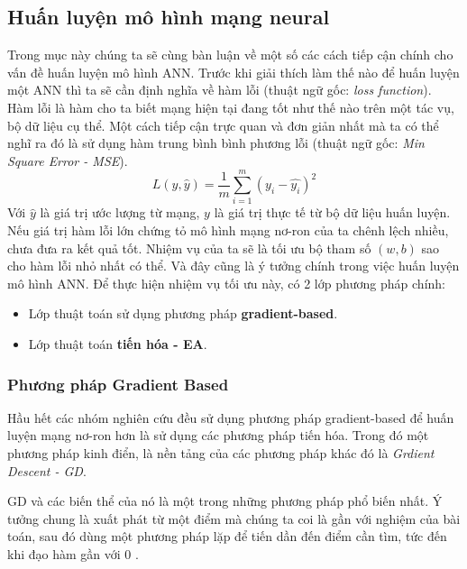     \subsection{Huấn luyện mô hình mạng neural}
    Trong mục này chúng ta sẽ cùng bàn luận về một số các cách tiếp cận chính cho vấn đề huấn luyện mô hình ANN.
    Trước khi giải thích làm thế nào để huấn luyện một ANN thì ta sẽ cần định nghĩa về hàm lỗi (thuật ngữ gốc: \emph{loss function}). Hàm lỗi là hàm cho ta biết mạng hiện tại đang tốt như thế nào trên một tác vụ, bộ dữ liệu cụ thể. Một cách tiếp cận trực quan và đơn giản nhất mà ta có thể nghĩ ra đó là sử dụng hàm trung bình bình phương lỗi (thuật ngữ gốc: \emph{Min Square Error - MSE}).
    \begin{equation}
      L(y, \widehat{y}) = \frac{1}{m}\sum_{i=1}^m(y_i - \widehat{y_i})^2
    \end{equation}
    Với $\widehat{y}$ là giá trị ước lượng từ mạng, $y$ là giá trị thực tế từ bộ dữ liệu huấn luyện. Nếu giá trị hàm lỗi lớn chứng tỏ mô hình mạng nơ-ron của ta chênh lệch nhiều, chưa đưa ra kết quả tốt. Nhiệm vụ của ta sẽ là tối ưu bộ tham số $(w,b)$ sao cho hàm lỗi nhỏ nhất có thể. Và đây cũng là ý tưởng chính trong việc huấn luyện mô hình ANN. Để thực hiện nhiệm vụ tối ưu này, có 2 lớp phương pháp chính:
    \begin{itemize}
        \item Lớp thuật toán sử dụng phương pháp \textbf{gradient-based}.
        \item Lớp thuật toán \textbf{tiến hóa - EA}.
    \end{itemize}
    \subsubsection{Phương pháp Gradient Based}
    Hầu hết các nhóm nghiên cứu đều sử dụng phương pháp gradient-based để huấn luyện mạng nơ-ron hơn là sử dụng các phương pháp tiến hóa. Trong đó một phương pháp kinh điển, là nền tảng của các phương pháp khác đó là \emph{Grdient Descent - GD}.
    
    GD và các biến thể của nó là một trong những phương pháp phổ biến
    nhất. Ý tưởng chung là xuất phát từ một điểm mà chúng ta coi là gần với nghiệm
    của bài toán, sau đó dùng một phương pháp lặp để tiến dần đến điểm cần tìm,
    tức đến khi đạo hàm gần với 0 \cite{lecun2015deep}. 
    
